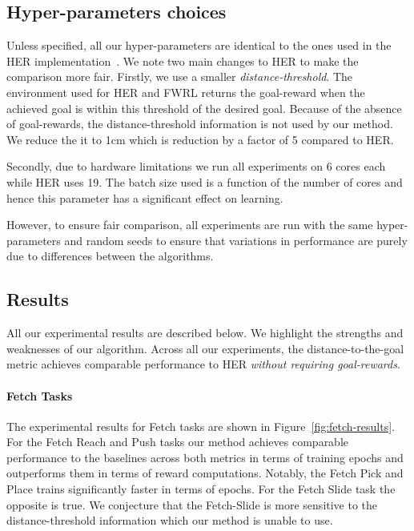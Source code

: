 %


\subsection{Hyper-parameters choices}
Unless specified, all our hyper-parameters are identical to the ones
used in the HER
implementation~\citep{dhariwal2017baselines}. We note two main changes
to HER to make the comparison more fair. Firstly,
we use a smaller \emph{distance-threshold}.
The environment used for HER and FWRL returns the goal-reward when the
achieved goal is within this threshold of the desired goal. Because of
the absence of goal-rewards, the distance-threshold information is not used by our
method.
We reduce the it to 1cm which is reduction by a factor of 5 compared to
HER.

Secondly, due to hardware limitations we run all experiments on 6
cores each
while HER uses 19. The batch size used is a function of the number of
cores and hence this parameter has a significant effect on learning. 

However, to ensure fair comparison, all experiments are run with the same hyper-parameters and
random seeds to ensure that variations in performance are purely due
to differences between the algorithms.

\subsection{Results}
All our experimental results are described below. We highlight the strengths and
weaknesses of our algorithm. Across all our experiments, the
distance-to-the-goal metric achieves comparable performance to HER
\emph{without requiring goal-rewards}. 

\paragraph{Fetch Tasks}

The experimental results for Fetch tasks are shown in
Figure~\ref{fig:fetch-results}. For the Fetch Reach and Push tasks our
method achieves comparable performance to the baselines 
across both metrics in terms of training epochs and outperforms them in
terms of reward computations. Notably, the Fetch
Pick and Place trains significantly faster in terms of epochs. For the Fetch
Slide task the opposite is true.
We conjecture that the Fetch-Slide is more sensitive to the
distance-threshold information which our method is unable to use.

